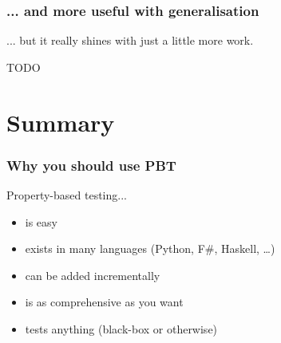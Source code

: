 \documentclass{beamer}
\begin{document}
\begin{frame}[fragile]
\frametitle{... and more useful with generalisation}
... but it really shines with just a little more work.

\begin{fslisting}
    TODO 
\end{fslisting}
\end{frame}

\section{Summary}
\begin{frame}
\frametitle{Why you should use PBT}
Property-based testing...
\begin{itemize}
\item is easy
\item exists in many languages (Python, F\#, Haskell, \dots)
\item can be added incrementally
\item is as comprehensive as you want
\item tests anything (black-box or otherwise)
\end{itemize}
\end{frame}
\end{document}
